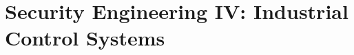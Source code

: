 \documentclass[../main.tex]{subfiles}
\begin{document}
\chapter{Security Engineering IV: Industrial Control Systems}
\label{ch:industrial-control-systems}

\end{document}
